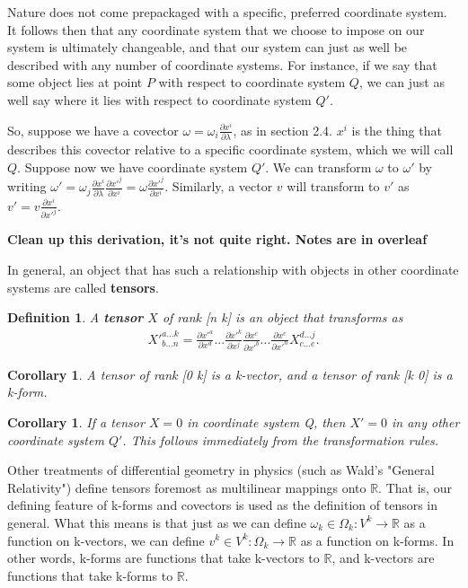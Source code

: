 \documentclass{book}
\newtheorem{defn}[equation]{Definition}
\newtheorem{coro}[equation]{Corollary}
\begin{document}
Nature does not come prepackaged with a specific, preferred coordinate system. It follows then that any coordinate system that we choose to impose on our system is ultimately changeable, and that our system can just as well be described with any number of coordinate systems. For instance, if we say that some object lies at point $P$ with respect to coordinate system $Q$, we can just as well say where it lies with respect to coordinate system $Q'$. 

So, suppose we have a covector $\omega = \omega_i \frac{\partial x^i}{\partial \lambda}$, as in section 2.4. $x^i$ is the thing that describes this covector relative to a specific coordinate system, which we will call $Q$. Suppose now we have coordinate system $Q'$. We can transform $\omega$ to $\omega'$ by writing $\omega' = \omega_j \frac{\partial x^i}{\partial \lambda} \frac{\partial x'^j}{\partial x^i} = \omega \frac{\partial x'^j}{\partial x^i}$. Similarly, a vector $v$ will transform to $v'$ as $v' = v \frac{\partial x^i}{\partial x'^j}$. 

\textbf{Clean up this derivation, it's not quite right. Notes are in overleaf}

In general, an object that has such a relationship with objects in other coordinate systems are called \textbf{tensors}. 



\begin{defn}
	A \textbf{tensor} $X$ of rank [n k] is an object that transforms as \begin{gather}X'^{a...k}_{b...n} = \frac{\partial x'^a}{\partial x^d} ... \frac{\partial x'^k}{\partial x^j} \frac{\partial x^c}{\partial x'^b} ... \frac{\partial x^e}{\partial x'^n} X^{d...j}_{c...e}.\end{gather} 
\end{defn}

\begin{coro}
	A tensor of rank [0 k] is a k-vector, and a tensor of rank [k 0] is a k-form. 
\end{coro}



\begin{coro}
	If a tensor $X = 0$ in coordinate system Q, then $X' = 0$ in any other coordinate system $Q'$. This follows immediately from the transformation rules. 
\end{coro}

Other treatments of differential geometry in physics (such as Wald's "General Relativity") define tensors foremost as multilinear mappings onto $\mathbb{R}$. That is, our defining feature of k-forms and covectors is used as the definition of tensors in general. What this means is that just as we can define $\omega_k \in \Omega_k : V^k \to \mathbb{R}$ as a function on k-vectors, we can define $v^k \in V^k : \Omega_k \to \mathbb{R}$ as a function on k-forms. In other words, k-forms are functions that take k-vectors to $\mathbb{R}$, and k-vectors are functions that take k-forms to $\mathbb{R}$. 
\end{document}

